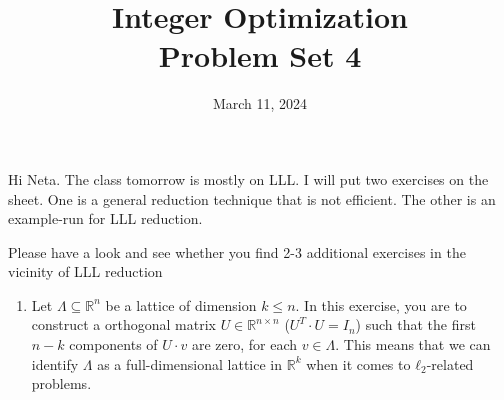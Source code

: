 \documentclass[11pt,a4paper]{article}
\title{Integer Optimization  \\ Problem Set 4 }
\date{ March 11, 2024}
\begin{document}
\maketitle 

Hi Neta. The class tomorrow is mostly on LLL. I will put two exercises on the sheet. One is a general reduction technique that is not efficient. The other is an example-run for LLL reduction.

Please have a look and see whether you find 2-3 additional exercises in the vicinity of LLL reduction 


\begin{enumerate}[1)]
\item Let $Λ ⊆ ℝ^n$ be a lattice of dimension $k≤n$. In this exercise, you are to construct a orthogonal matrix $U ∈ ℝ^{n × n}$  ($U^T ⋅U = I_n$) such that the first $n-k$ components of  $U ⋅ v$ are zero, for each $v ∈ Λ$. This means that we can identify $Λ$ as a full-dimensional lattice in $ℝ^k$ when it comes to $ℓ_2$-related problems. 


\end{enumerate}
\end{document}
